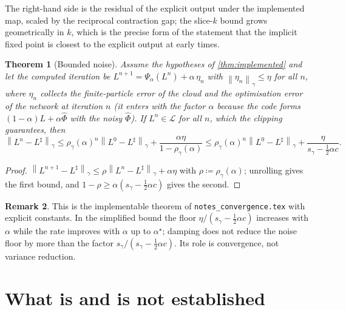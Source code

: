 \documentclass[11pt,a4paper]{article}
\theoremstyle{plain}
\newtheorem{theorem}{Theorem}[section]
\theoremstyle{definition}
\theoremstyle{definition}
\newtheorem{remark}[theorem]{Remark}
\newcommand{\norm}[1]{\left\lVert #1 \right\rVert}
\newcommand{\Lev}{L}
\newcommand{\Phimap}{\Phi}
\newcommand{\Psal}{\Psi_\alpha}
\newcommand{\Lset}{\mathcal{L}}
\begin{document}
The right-hand side is the residual of the explicit output under the implemented map, scaled by the reciprocal contraction gap; the slice-$k$ bound grows geometrically in $k$, which is the precise form of the statement that the implicit fixed point is closest to the explicit output at early times.

\begin{theorem}[Bounded noise]\label{thm:noise}
Assume the hypotheses of \cref{thm:implemented} and let the computed iteration be $\Lev^{n+1} = \Psal(\Lev^n) + \alpha\, \eta_n$ with $\norm{\eta_n}_\gamma \le \eta$ for all $n$, where $\eta_n$ collects the finite-particle error of the cloud and the optimisation error of the network at iteration $n$ (it enters with the factor $\alpha$ because the code forms $(1-\alpha)\Lev + \alpha \widehat{\Phimap}$ with the noisy $\widehat{\Phimap}$). If $\Lev^n \in \Lset$ for all $n$, which the clipping guarantees, then
\[
  \norm{\Lev^n - \Lev^\sharp}_\gamma
  \le \rho_\gamma(\alpha)^n \norm{\Lev^0 - \Lev^\sharp}_\gamma + \frac{\alpha\eta}{1 - \rho_\gamma(\alpha)}
  \le \rho_\gamma(\alpha)^n \norm{\Lev^0 - \Lev^\sharp}_\gamma + \frac{\eta}{s_\gamma - \tfrac12 \alpha c} .
\]
\end{theorem}

\begin{proof}
$\norm{\Lev^{n+1} - \Lev^\sharp}_\gamma \le \rho \norm{\Lev^n - \Lev^\sharp}_\gamma + \alpha\eta$ with $\rho \coloneqq \rho_\gamma(\alpha)$; unrolling gives the first bound, and $1 - \rho \ge \alpha(s_\gamma - \tfrac12 \alpha c)$ gives the second.
\end{proof}

\begin{remark}
This is the implementable theorem of \texttt{notes\_convergence.tex} with explicit constants. In the simplified bound the floor $\eta / (s_\gamma - \tfrac12 \alpha c)$ increases with $\alpha$ while the rate improves with $\alpha$ up to $\alpha^\star$; damping does not reduce the noise floor by more than the factor $s_\gamma / (s_\gamma - \tfrac12 \alpha c)$. Its role is convergence, not variance reduction.
\end{remark}

\section{What is and is not established}\label{sec:status}
\end{document}
